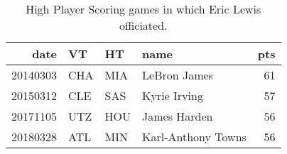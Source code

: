 \begin{table}[ht]
\centering
\begin{tabular}{rlllr}
  \hline
date & VT & HT & name & pts \\ 
  \hline
20140303 & CHA & MIA & LeBron James &  61 \\ 
  20150312 & CLE & SAS & Kyrie Irving &  57 \\ 
  20171105 & UTZ & HOU & James Harden &  56 \\ 
  20180328 & ATL & MIN & Karl-Anthony Towns &  56 \\ 
   \hline
\end{tabular}
\caption{High Player Scoring games in which Eric Lewis officiated.} 
\end{table}

